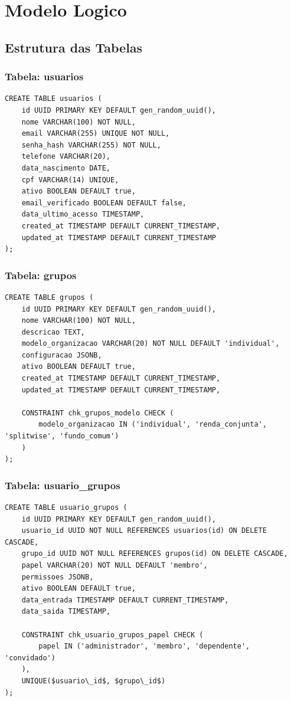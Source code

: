 \section{Modelo Logico}

\subsection{Estrutura das Tabelas}

\subsubsection{Tabela: usuarios}
\begin{lstlisting}[caption=Estrutura da tabela usuarios]
CREATE TABLE usuarios (
    id UUID PRIMARY KEY DEFAULT gen_random_uuid(),
    nome VARCHAR(100) NOT NULL,
    email VARCHAR(255) UNIQUE NOT NULL,
    senha_hash VARCHAR(255) NOT NULL,
    telefone VARCHAR(20),
    data_nascimento DATE,
    cpf VARCHAR(14) UNIQUE,
    ativo BOOLEAN DEFAULT true,
    email_verificado BOOLEAN DEFAULT false,
    data_ultimo_acesso TIMESTAMP,
    created_at TIMESTAMP DEFAULT CURRENT_TIMESTAMP,
    updated_at TIMESTAMP DEFAULT CURRENT_TIMESTAMP
);
\end{lstlisting}

\subsubsection{Tabela: grupos}
\begin{lstlisting}[caption=Estrutura da tabela grupos]
CREATE TABLE grupos (
    id UUID PRIMARY KEY DEFAULT gen_random_uuid(),
    nome VARCHAR(100) NOT NULL,
    descricao TEXT,
    modelo_organizacao VARCHAR(20) NOT NULL DEFAULT 'individual',
    configuracao JSONB,
    ativo BOOLEAN DEFAULT true,
    created_at TIMESTAMP DEFAULT CURRENT_TIMESTAMP,
    updated_at TIMESTAMP DEFAULT CURRENT_TIMESTAMP,
    
    CONSTRAINT chk_grupos_modelo CHECK (
        modelo_organizacao IN ('individual', 'renda_conjunta', 'splitwise', 'fundo_comum')
    )
);
\end{lstlisting}

\subsubsection{Tabela: usuario\_grupos}
\begin{lstlisting}[caption=Estrutura da tabela usuario_grupos (relacionamento N:M)]
CREATE TABLE usuario_grupos (
    id UUID PRIMARY KEY DEFAULT gen_random_uuid(),
    usuario_id UUID NOT NULL REFERENCES usuarios(id) ON DELETE CASCADE,
    grupo_id UUID NOT NULL REFERENCES grupos(id) ON DELETE CASCADE,
    papel VARCHAR(20) NOT NULL DEFAULT 'membro',
    permissoes JSONB,
    ativo BOOLEAN DEFAULT true,
    data_entrada TIMESTAMP DEFAULT CURRENT_TIMESTAMP,
    data_saida TIMESTAMP,
    
    CONSTRAINT chk_usuario_grupos_papel CHECK (
        papel IN ('administrador', 'membro', 'dependente', 'convidado')
    ),
    UNIQUE($usuario\_id$, $grupo\_id$)
);
\end{lstlisting}

